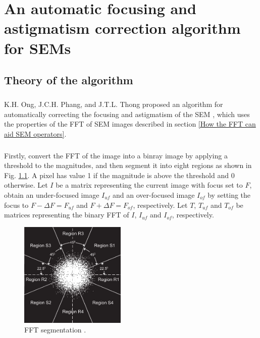 \documentclass[12pt, twocolumn]{report}
\begin{document}
\chapter{An automatic focusing and astigmatism correction algorithm for SEMs} \label{An automatic focusing and astigmatism correction algorithm for SEMs}
\section{Theory of the algorithm}
\paragraph{}
K.H. Ong, J.C.H. Phang, and J.T.L. Thong proposed an algorithm for automatically correcting the focusing and astigmatism of the SEM \cite{SEM correction algorithm}, which uses the properties of the FFT of SEM images described in section \ref{How the FFT can aid SEM operators}.

\paragraph{}
Firstly, convert the FFT of the image into a binray image by applying a threshold to the magnitudes, and then segment it into eight regions as shown in Fig. \ref{Correction algorithm FFT segmentation}. A pixel has value 1 if the magnitude is above the threshold and 0 otherwise. Let $I$ be a matrix representing the current image with focus set to $F$, obtain an under-focused image $I_{uf}$ and an over-focused image $I_{of}$ by setting the focus to $F-\Delta F=F_{uf}$ and $F+\Delta F=F_{of}$, respectively. Let $T$, $T_{uf}$ and $T_{of}$ be matrices representing the binary FFT of $I$, $I_{uf}$ and $I_{of}$, respectively.

\begin{figure}[htbp]
    \centering
    \includegraphics[width=0.45\textwidth]{Figures/Correction algorithm FFT segmentation.jpg}
    \caption{FFT segmentation \cite{SEM correction algorithm}.}
    \label{Correction algorithm FFT segmentation}
\end{figure}
\end{document}
